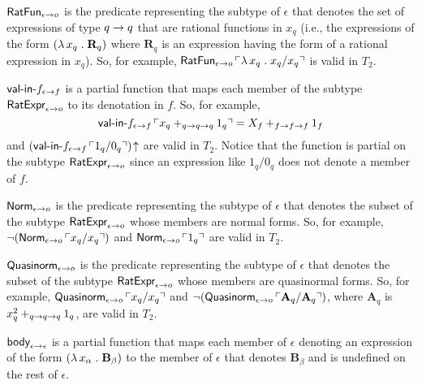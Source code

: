 \documentclass[fleqn]{llncs}
\begin{document}
  \item $\mbox{\sf RatFun}_{\epsilon \rightarrow o}$ is the predicate
    representing the subtype of $\epsilon$ that denotes the set of
    expressions of type $q \rightarrow q$ that are rational functions in
    $x_q$ (i.e., the expressions of the form $(\lambda\, x_q \mathrel.
    \textbf{R}_q)$ where $\textbf{R}_q$ is an expression having the
    form of a rational expression in $x_q$).  So, for example,
    $\mbox{\sf RatFun}_{\epsilon \rightarrow o} \, \ulcorner\lambda\, x_q
      \mathrel. x_q/x_q\urcorner$ is valid in $T_2$.

  \item \bsp $\mbox{\sf val-in-}f_{\epsilon \rightarrow f}$ is a partial
    function that maps each member of the subtype
    $\mbox{\sf RatExpr}_{\epsilon \rightarrow o}$ to its denotation in $f$.
    So, for example, \[\mbox{\sf val-in-}f_{\epsilon \rightarrow f} \,
    \ulcorner x_q +_{q \rightarrow q \rightarrow q} 1_q\urcorner = X_f +_{f \rightarrow f
      \rightarrow f} 1_f\] and $(\mbox{\sf val-in-}f_{\epsilon \rightarrow f} \,
    \ulcorner1_q/0_q\urcorner)\!\uparrow$ are valid in $T_2$.  Notice that
    the function is partial on the subtype $\mbox{\sf RatExpr}_{\epsilon
      \rightarrow o}$ since an expression like $1_q/0_q$ does not denote a
    member of $f$. \esp

  \item \bsp $\mbox{\sf Norm}_{\epsilon \rightarrow o}$ is the predicate
    representing the subtype of $\epsilon$ that denotes the subset of
    the subtype $\mbox{\sf RatExpr}_{\epsilon \rightarrow o}$ whose members
    are normal forms.  So, for example, $\neg(\mbox{\sf Norm}_{\epsilon
      \rightarrow o} \, \ulcorner x_q/x_q\urcorner)$ and $\mbox{\sf Norm}_{\epsilon
      \rightarrow o} \, \ulcorner1_q\urcorner$ are valid in $T_2$.\esp

  \item \bsp $\mbox{\sf Quasinorm}_{\epsilon \rightarrow o}$ is the predicate
    representing the subtype of $\epsilon$ that denotes the subset of
    the subtype $\mbox{\sf RatExpr}_{\epsilon \rightarrow o}$ whose members
    are quasinormal forms.  So, for example,
    $\mbox{\sf Quasinorm}_{\epsilon \rightarrow o} \, \ulcorner x_q/x_q\urcorner$ and
    $\neg(\mbox{\sf Quasinorm}_{\epsilon \rightarrow o} \,
    \ulcorner\textbf{A}_q/\textbf{A}_q\urcorner)$, where $\textbf{A}_q$ is
    $x^{2}_{q} +_{q \rightarrow q \rightarrow q} 1_q$, are valid in
    $T_2$. \esp

  \item $\mbox{\sf body}_{\epsilon \rightarrow \epsilon}$ is a partial
    function that maps each member of $\epsilon$ denoting an
    expression of the form $(\lambda\, x_\alpha \mathrel.
    \textbf{B}_\beta)$ to the member of $\epsilon$ that denotes
    $\textbf{B}_\beta$ and is undefined on the rest of $\epsilon$.
\end{document}
